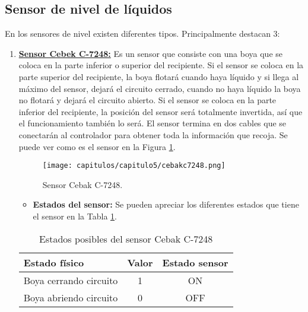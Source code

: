 \clearpage
\subsection{Sensor de nivel de líquidos}

En los sensores de nivel existen diferentes tipos. Principalmente destacan 3:


\begin{enumerate}
    \item \underline{\textbf{Sensor Cebek C-7248:}} Es un sensor que consiste con una boya que se coloca en la parte inferior o superior del recipiente. Si el sensor se coloca en la parte superior del recipiente, la boya flotará cuando haya líquido y si llega al máximo del sensor, dejará el circuito cerrado, cuando no haya líquido la boya no flotará y dejará el circuito abierto. Si el sensor se coloca en la parte inferior del recipiente, la posición del sensor será totalmente invertida, así que el funcionamiento también lo será. El sensor termina en dos cables que se conectarán al controlador para obtener toda la información que recoja. Se puede ver como es el sensor en la Figura \ref{fig:cebakc7248}.

\begin{figure}[h] 
    \centering
    \texttt{[image: capitulos/capitulo5/cebakc7248.png]}
    \caption{Sensor Cebak C-7248.}
    \label{fig:cebakc7248}
\end{figure}

\begin{itemize}
    \item \textbf{Estados del sensor:} Se pueden apreciar los diferentes estados que tiene el sensor en la Tabla \ref{tab:cebakc7248}.
\end{itemize}

\begin{table}[h]
    \centering
    \begin{tabular}{|l|c|c|}
        \rowcolor[gray]{.5}
        \hline
         \color{white}Estado físico&\color{white}Valor&\color{white}Estado sensor \\
         \hline
         Boya cerrando circuito&1&ON \\
         \hline
         Boya abriendo circuito&0&OFF  \\
         \hline
    \end{tabular}
    \caption{Estados posibles del sensor Cebak C-7248}
    \label{tab:cebakc7248}
\end{table}


\end{enumerate}
